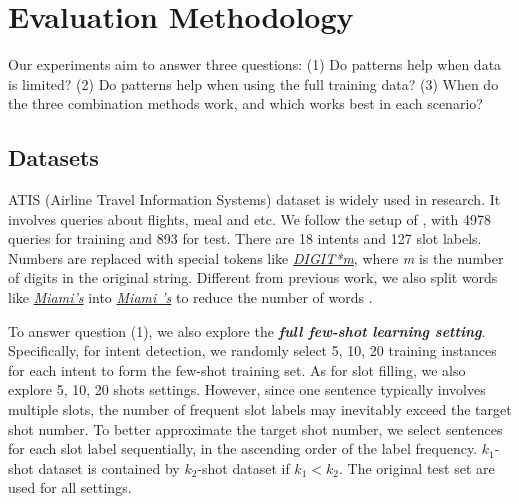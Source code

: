 \section{Evaluation Methodology}
Our experiments aim to answer three questions: (1) Do \RE patterns help when data is limited? (2) Do \RE patterns help when using the full training data? (3) When do the three combination methods work, and which works best in each scenario?

\subsection{Datasets}
\label{sec_datasest} ATIS (Airline Travel Information Systems) dataset \cite{hemphill1990atis} is widely used in \SLU research. It involves
queries about flights, meal and etc. We follow the setup of \cite{liu2016attention}, with 4978 queries for training and 893 for test. There
are 18 intents and 127 slot labels. Numbers are replaced with special tokens like \textsl{\underline{DIGIT*m}}, where \emph{m} is the
number of digits in the original string. Different from previous work, we also split words like \textsl{\underline{Miami's}} into
\textsl{\underline{Miami 's}}  to reduce the
number of words .

To answer question (1), we also explore the \textbf{\emph{full few-shot learning setting}}. Specifically, for intent detection, we randomly
select 5, 10, 20 training instances for each intent to form the few-shot training set. As for slot filling, we also explore 5, 10, 20 shots
settings. However, since one sentence typically involves multiple slots, the number of frequent slot labels may inevitably exceed the
target shot number. To better approximate the target shot number, we select sentences for each slot label sequentially, in the ascending
order of the label frequency.
$k_1$-shot dataset is contained by $k_2$-shot dataset if $k_1 < k_2$.
The original test set are used for all settings.

